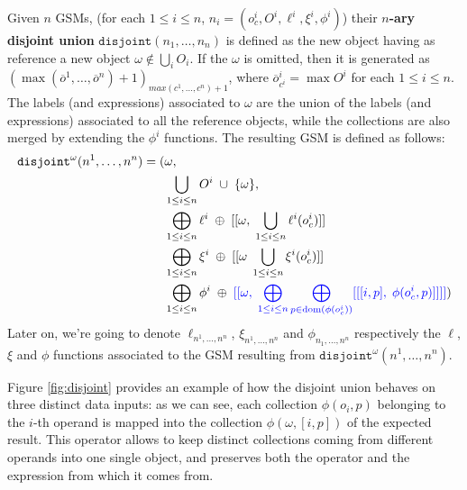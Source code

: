 \begin{definition}\label{gsql:disjoint}
	Given $n$ GSMs, (for each $1\leq i\leq n$, $n_i=(o_c^i,O^i,\ell^i,\xi^i,\phi^i)$) their \textbf{$n$-ary disjoint union}  $\texttt{disjoint}(n_1,\dots,n_n)$ is defined as the new object having as reference a new object $\omega\notin \bigcup_i O_i$. If the $\omega$ is omitted, then it is generated as  $(\max(\overline{o}^1,\dots,\overline{o}^n)+1)_{max(c^1,\dots,c^n)+1}$, where $\overline{o}^i_{c^i}=\max O^i$ for each $1\leq i\leq n$.
	 The labels (and expressions) associated to $\omega$ are the union of the labels (and expressions) associated to all the reference objects, while the collections are also merged by extending the $\phi^i$  functions.%
%
	The resulting GSM is defined as follows:
	\begin{alignat*}{2}
	\texttt{disjoint}^\omega(n^1,\dots,n^n)=(&\omega,\\
	&\bigcup_{1\leq i\leq n}O^i\;\cup\;\{\omega\},\\
	&\bigoplus_{1\leq i\leq n}\ell^i\;\oplus\;[[\omega,\; \bigcup_{1\leq i\leq n}\ell^i(o_c^i)]]\\
	&\bigoplus_{1\leq i\leq n}\xi^i\;\oplus\;[[\omega\; \bigcup_{1\leq i\leq n}\xi^i(o_c^i)]]\\
	&\bigoplus_{1\leq i\leq n}\phi^i\;\oplus\; {\color{blue}[[\omega,\; \bigoplus_{1\leq i\leq n}\bigoplus_{p\in\operatorname{dom}(\phi(o^i_c))}[[[i,p],\; \phi(o^i_c,p)]]]]})\\
	\end{alignat*}
Later on, we're going to denote $\ell_{n^1,\dots,n^n}$, $\xi_{n^1,\dots,n^n}$ and $\phi_{n_1,\dots,n^n}$ respectively the $\ell$, $\xi$ and $\phi$ functions associated to the GSM resulting from $\texttt{disjoint}^\omega(n^1,\dots,n^n)$.
\end{definition}



\begin{example}
	Figure \vref{fig:disjoint} provides an example of how the disjoint union behaves on three distinct data inputs: as we can see, each collection $\phi(o_i,p)$ belonging to the $i$-th operand is mapped into the collection $\phi(\omega,[i,p])$ of the expected result. This operator allows to keep distinct collections coming from different operands into one single object, and preserves both the operator and the expression from which it comes from.
\end{example}

